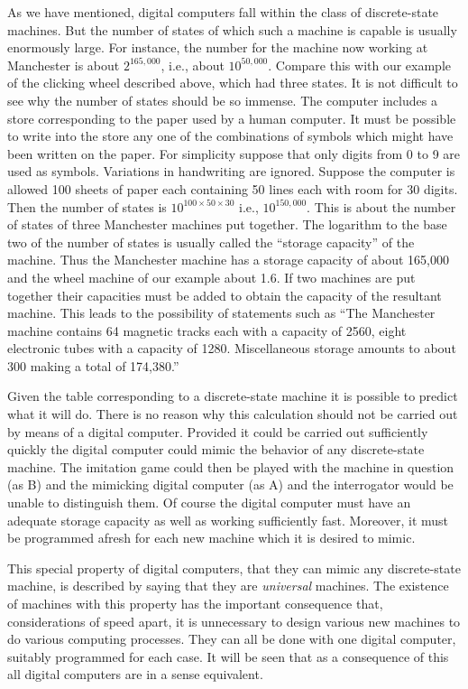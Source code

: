 \documentclass[10pt,twoside,openright]{memoir}
\begin{document}
As we have mentioned, digital computers fall within the class of discrete-state machines. But the number of states of which such a machine is capable is usually enormously large. For instance, the number for the machine now working at Manchester is about $2^{165,000}$, i.e., about $10^{50,000}$. Compare this with our example of the clicking wheel described above, which had three states. It is not difficult to see why the number of states should be so immense. The computer includes a store corresponding to the paper used by a human computer. It must be possible to write into the store any one of the combinations of symbols which might have been written on the paper. For simplicity suppose that only digits from 0 to 9 are used as symbols. Variations in handwriting are ignored. Suppose the computer is allowed 100 sheets of paper each containing 50 lines each with room for 30 digits. Then the number of states is $10^{100 \times 50 \times 30}$ i.e., $10^{150,000}$. This is about the number of states of three Manchester machines put together. The logarithm to the base two of the number of states is usually called the ``storage capacity'' of the machine. Thus the Manchester machine has a storage capacity of about 165,000 and the wheel machine of our example about 1.6. If two machines are put together their capacities must be added to obtain the capacity of the resultant machine. This leads to the possibility of statements such as ``The Manchester machine contains 64 magnetic tracks each with a capacity of 2560, eight electronic tubes with a capacity of 1280. Miscellaneous storage amounts to about 300 making a total of 174,380.''

Given the table corresponding to a discrete-state machine it is possible to predict what it will do. There is no reason why this calculation should not be carried out by means of a digital computer. Provided it could be carried out sufficiently quickly the digital computer could mimic the behavior of any discrete-state machine. The imitation game could then be played with the machine in question (as B) and the mimicking digital computer (as A) and the interrogator would be unable to distinguish them. Of course the digital computer must have an adequate storage capacity as well as working sufficiently fast. Moreover, it must be programmed afresh for each new machine which it is desired to mimic.

This special property of digital computers, that they can mimic any discrete-state machine, is described by saying that they are \emph{universal} machines. The existence of machines with this property has the important consequence that, considerations of speed apart, it is unnecessary to design various new machines to do various computing processes. They can all be done with one digital computer, suitably programmed for each case. It will be seen that as a consequence of this all digital computers are in a sense equivalent.
\end{document}
